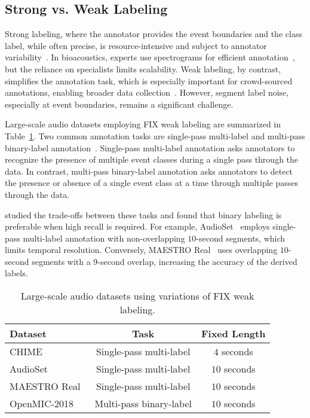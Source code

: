 \subsection{Strong vs. Weak Labeling}

Strong labeling, where the annotator provides the event boundaries and the class label, while often precise, is resource-intensive and subject to annotator variability~\citep{Mesaros2017}. In bioacoustics, experts use spectrograms for efficient annotation~\citep{Cartwright2017}, but the reliance on specialists limits scalability. Weak labeling, by contrast, simplifies the annotation task, which is especially important for crowd-sourced annotations, enabling broader data collection~\citep{Martin-Morato2023a}. However, segment label noise, especially at event boundaries, remains a significant challenge.

Large-scale audio datasets employing FIX weak labeling are summarized in Table~\ref{tab:fix_datasets}. Two common annotation tasks are single-pass multi-label and multi-pass binary-label annotation~\citep{Cartwright2019}. Single-pass multi-label annotation asks annotators to recognize the presence of multiple event classes during a single pass through the data. In contrast, multi-pass binary-label annotation asks annotators to detect the presence or absence of a single event class at a time through multiple passes through the data.

\citet{Cartwright2019} studied the trade-offs between these tasks and found that binary labeling is preferable when high recall is required. For example, AudioSet~\citep{Gemmeke2017} employs single-pass multi-label annotation with non-overlapping $10$-second segments, which limits temporal resolution. Conversely, MAESTRO Real~\citep{Martin-Morato2023a} uses overlapping $10$-second segments with a $9$-second overlap, increasing the accuracy of the derived labels.

\begin{table}[t]
    \centering
    \begin{tabular}{l c c}
         Dataset                  & Task                & Fixed Length \\
         \hline
         CHIME~\citep{Foster2015}     & Single-pass multi-label & $4$ seconds \\
         AudioSet~\citep{Gemmeke2017} & Single-pass multi-label & $10$ seconds \\
         MAESTRO Real~\citep{Martin-Morato2023a} & Single-pass multi-label & $10$ seconds \\
         OpenMIC-2018~\citep{Humphrey2018} & Multi-pass binary-label & $10$ seconds \\
    \end{tabular}
    \caption{Large-scale audio datasets using variations of FIX weak labeling.}
    \label{tab:fix_datasets}
\end{table}

